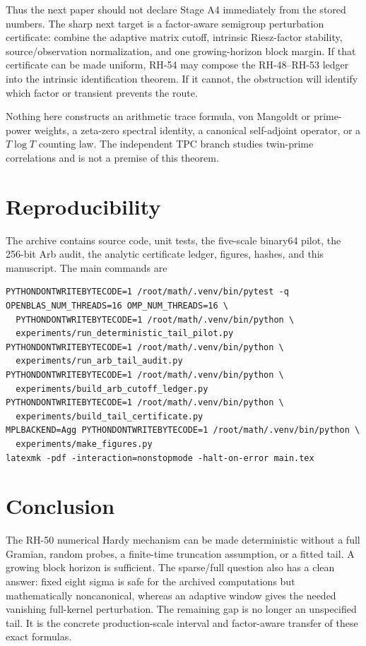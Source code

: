 \documentclass[11pt]{article}
\theoremstyle{remark}
\begin{document}
Thus the next paper should not declare Stage A4 immediately from the stored
numbers.  The sharp next target is a factor-aware semigroup perturbation
certificate: combine the adaptive matrix cutoff, intrinsic Riesz-factor
stability, source/observation normalization, and one growing-horizon block
margin.  If that certificate can be made uniform, RH-54 may compose the
RH-48--RH-53 ledger into the intrinsic identification theorem.  If it cannot,
the obstruction will identify which factor or transient prevents the route.

Nothing here constructs an arithmetic trace formula, von Mangoldt or
prime-power weights, a zeta-zero spectral identity, a canonical self-adjoint
operator, or a \(T\log T\) counting law.  The independent TPC branch studies
twin-prime correlations and is not a premise of this theorem.

\section{Reproducibility}

The archive contains source code, unit tests, the five-scale binary64 pilot,
the 256-bit Arb audit, the analytic certificate ledger, figures, hashes, and
this manuscript.  The main commands are
\begin{verbatim}
PYTHONDONTWRITEBYTECODE=1 /root/math/.venv/bin/pytest -q
OPENBLAS_NUM_THREADS=16 OMP_NUM_THREADS=16 \
  PYTHONDONTWRITEBYTECODE=1 /root/math/.venv/bin/python \
  experiments/run_deterministic_tail_pilot.py
PYTHONDONTWRITEBYTECODE=1 /root/math/.venv/bin/python \
  experiments/run_arb_tail_audit.py
PYTHONDONTWRITEBYTECODE=1 /root/math/.venv/bin/python \
  experiments/build_arb_cutoff_ledger.py
PYTHONDONTWRITEBYTECODE=1 /root/math/.venv/bin/python \
  experiments/build_tail_certificate.py
MPLBACKEND=Agg PYTHONDONTWRITEBYTECODE=1 /root/math/.venv/bin/python \
  experiments/make_figures.py
latexmk -pdf -interaction=nonstopmode -halt-on-error main.tex
\end{verbatim}

\section{Conclusion}

The RH-50 numerical Hardy mechanism can be made deterministic without a
full Gramian, random probes, a finite-time truncation assumption, or a fitted
tail.  A growing block horizon is sufficient.  The sparse/full question also
has a clean answer: fixed eight sigma is safe for the archived computations
but mathematically noncanonical, whereas an adaptive window gives the needed
vanishing full-kernel perturbation.  The remaining gap is no longer an
unspecified tail.  It is the concrete production-scale interval and
factor-aware transfer of these exact formulas.



\end{document}
